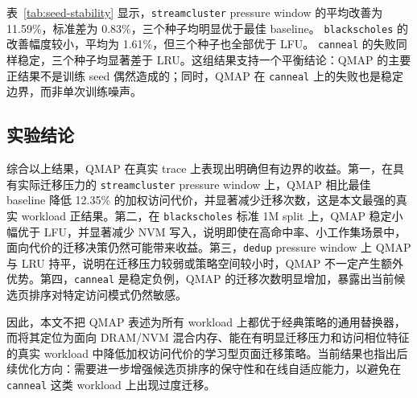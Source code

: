表~\ref{tab:seed-stability} 显示，\texttt{streamcluster} pressure window 的平均改善为 11.59\%，标准差为 0.83\%，三个种子均明显优于最佳 baseline。 \texttt{blackscholes} 的改善幅度较小，平均为 1.61\%，但三个种子也全部优于 LFU。 \texttt{canneal} 的失败同样稳定，三个种子均显著差于 LRU。这组结果支持一个平衡结论：QMAP 的主要正结果不是训练 seed 偶然造成的；同时，QMAP 在 \texttt{canneal} 上的失败也是稳定边界，而非单次训练噪声。

\subsection{实验结论}

综合以上结果，QMAP 在真实 trace 上表现出明确但有边界的收益。第一，在具有实际迁移压力的 \texttt{streamcluster} pressure window 上，QMAP 相比最佳 baseline 降低 12.35\% 的加权访问代价，并显著减少迁移次数，这是本文最强的真实 workload 正结果。第二，在 \texttt{blackscholes} 标准 1M split 上，QMAP 稳定小幅优于 LFU，并显著减少 NVM 写入，说明即使在高命中率、小工作集场景中，面向代价的迁移决策仍然可能带来收益。第三，\texttt{dedup} pressure window 上 QMAP 与 LRU 持平，说明在迁移压力较弱或策略空间较小时，QMAP 不一定产生额外优势。第四，\texttt{canneal} 是稳定负例，QMAP 的迁移次数明显增加，暴露出当前候选页排序对特定访问模式仍然敏感。

因此，本文不把 QMAP 表述为所有 workload 上都优于经典策略的通用替换器，而将其定位为面向 DRAM/NVM 混合内存、能在有明显迁移压力和访问相位特征的真实 workload 中降低加权访问代价的学习型页面迁移策略。当前结果也指出后续优化方向：需要进一步增强候选页排序的保守性和在线自适应能力，以避免在 \texttt{canneal} 这类 workload 上出现过度迁移。
